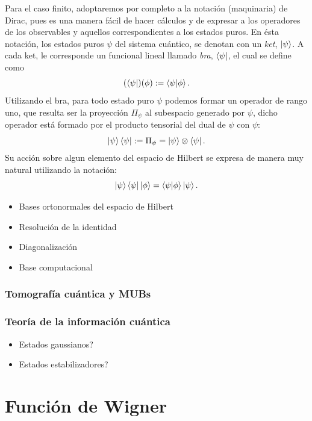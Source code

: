 \documentclass[a4paper]{report}
\begin{document}
  Para el caso finito, adoptaremos por completo a la
  notación (maquinaria) de Dirac, pues es una manera fácil
  de hacer cálculos y de expresar a los operadores de los
  observables y aquellos correspondientes a los estados
  puros. En ésta notación, los estados puros $\psi$ del
  sistema cuántico, se denotan con un \textit{ket}, $\ket
  \psi$. A cada ket, le corresponde un funcional lineal
  llamado \textit{bra}, $\bra \psi$, el cual se define como
  \[
    (\bra \psi)(\phi)
    := \braket{\psi|\phi}.
  \] 
  Utilizando el bra, para todo estado puro $\psi$ podemos
  formar un operador de rango uno, que resulta ser la
  proyección $\Pi_\psi$ al subespacio generado por $\psi$,
  dicho operador está formado por el producto tensorial del
  dual de $\psi$ con $\psi$:
  \[
    \ket \psi \bra \psi
    := \Pi_\psi
    = \ket \psi \otimes \bra \psi.
  \] 
  Su acción sobre algun elemento del espacio de Hilbert se
  expresa de manera muy natural utilizando la notación:
  \[
    \ket \psi \bra \psi \ket \phi
    = \braket{\psi|\phi} \ket \psi.
  \] 

  \begin{itemize}
    \item Bases ortonormales del espacio de Hilbert
    \item Resolución de la identidad
    \item Diagonalización
    \item Base computacional
  \end{itemize}

   

  \subsection{Tomografía cuántica y MUBs}

  \subsection{Teoría de la información cuántica}

  \begin{itemize}
    \item Estados gaussianos?
    \item Estados estabilizadores?
  \end{itemize}

  \chapter{Función de Wigner}
\end{document}
